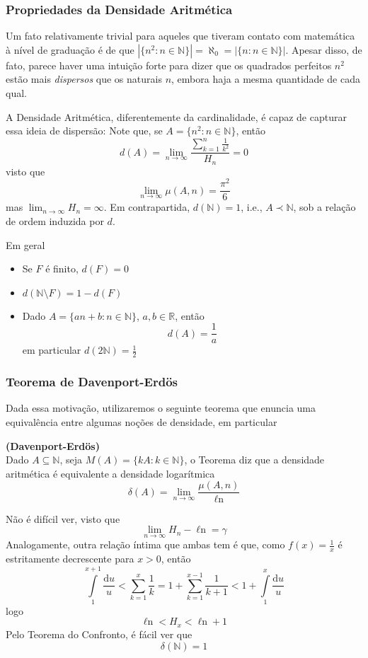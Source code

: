 \documentclass[11pt]{article}
\newcommand{\mbb}[1]{\mathbb{#1}}
\newcommand{\rp}[1]{{\left(#1\right)}}
\newcommand{\cl}[1]{\colorlet{shadecolor}{#1}}
\newcommand{\dd}{\mathrm{d}}
\renewcommand{\ln}[1]{{\mathop{\ell n\rp{#1}}}}
\begin{document}
\subsubsection{Propriedades da Densidade Aritmética}

Um fato relativamente trivial para aqueles que tiveram contato com matemática à nível de graduação é de que $|\{n^2:n\in\mbb{N}\}|=\aleph_0=|\{n:n\in\mbb{N}\}|$. Apesar disso, de fato, parece haver uma intuição forte para dizer que os quadrados perfeitos $n^2$ estão mais \textit{dispersos} que os naturais $n$, embora haja a mesma quantidade de cada qual.

A Densidade Aritmética, diferentemente da cardinalidade, é capaz de capturar essa ideia de dispersão: Note que, se $A=\{n^2:n\in\mbb{N}\}$, então
$$d(A)=\lim_{n\to\infty}\frac{\sum_{k=1}^n\frac{1}{k^2}}{H_n}=0$$
visto que
$$\lim_{n\to\infty}\mu(A,n)=\frac{\pi^2}{6}$$
mas $\lim_{n\to\infty}H_n=\infty$. Em contrapartida, $d(\mbb{N})=1$, i.e., $A\prec\mbb{N}$, sob a relação de ordem induzida por $d$.

Em geral
\begin{itemize}
    \item Se $F$ é finito, $d(F)=0$
    \item $d(\mbb{N}\setminus F)=1-d(F)$
    \item Dado $A=\{an+b:n\in\mbb{N}\}$, $a,b\in\mbb{R}$, então
    $$d(A)=\frac1a$$
    em particular $d(2\mbb{N})=\frac12$
\end{itemize}

\subsubsection{Teorema de Davenport-Erdös}

Dada essa motivação, utilizaremos o seguinte teorema que enuncia uma equivalência entre algumas noções de densidade, em particular

\cl{orange!15}
\begin{shaded}
\begin{theorem}\textbf{(Davenport-Erdös)}\\
    Dado $A\subseteq\mbb{N}$, seja $M(A)=\{kA:k\in\mbb{N}\}$, o Teorema diz que a densidade aritmética é equivalente a densidade logarítmica
    $$\delta(A)=\lim_{n\to\infty}\frac{\mu(A,n)}{\ln{n}}$$
\end{theorem}
\end{shaded}

Não é difícil ver, visto que
$$\lim_{n\to\infty}H_n-\ln{n}=\gamma$$
Analogamente, outra relação íntima que ambas tem é que, como $f(x)=\frac1x$ é estritamente decrescente para $x>0$, então
$$\int\limits_1^{x+1}\frac{\dd u}{u} < \sum_{k=1}^x\frac1k = 1 + \sum_{k=1}^{x-1}\frac{1}{k+1} < 1 + \int\limits_1^x\frac{\dd u}{u}$$
logo
$$\ln{x+1}<H_x<\ln{x}+1$$
Pelo Teorema do Confronto, é fácil ver que
$$\delta(\mbb{N})=1$$
\end{document}
